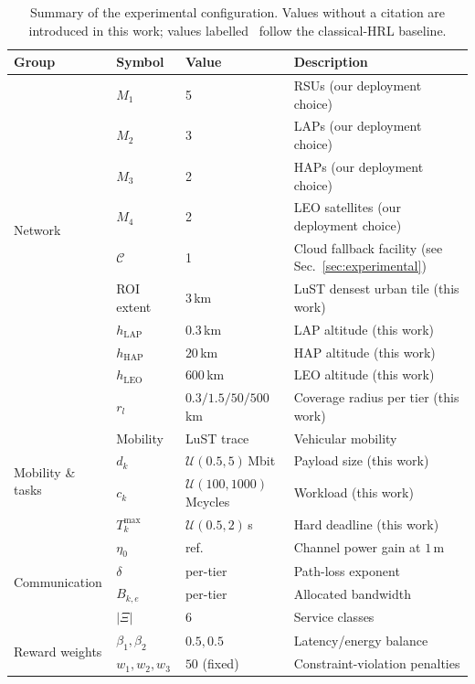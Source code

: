 \documentclass[11pt,a4paper]{article}
\theoremstyle{definition}
\begin{document}
\begin{table}[t]
\centering
\small
\caption{Summary of the experimental configuration. Values without a citation are introduced in this work; values labelled~\cite{hrl_ntn} follow the classical-HRL baseline.}
\label{tab:setup_summary}
\begin{tabular}{@{}llll@{}}
\toprule
\textbf{Group} & \textbf{Symbol} & \textbf{Value} & \textbf{Description} \\
\midrule
\multirow{9}{*}{Network}
  & $M_1$ & 5  & RSUs (our deployment choice) \\
  & $M_2$ & 3  & LAPs (our deployment choice) \\
  & $M_3$ & 2  & HAPs (our deployment choice) \\
  & $M_4$ & 2  & LEO satellites (our deployment choice) \\
  & $\mathcal{C}$ & 1 & Cloud fallback facility (see Sec.~\ref{sec:experimental}) \\
  & ROI extent & $3\,$km & LuST densest urban tile (this work) \\
  & $h_{\mathrm{LAP}}$ & $0.3\,$km & LAP altitude (this work) \\
  & $h_{\mathrm{HAP}}$ & $20\,$km & HAP altitude (this work) \\
  & $h_{\mathrm{LEO}}$ & $600\,$km & LEO altitude (this work) \\
  & $r_l$ & $0.3/1.5/50/500\,$km & Coverage radius per tier (this work) \\
\midrule
\multirow{4}{*}{Mobility \& tasks}
  & Mobility & LuST trace & Vehicular mobility~\cite{codeca2015lust} \\
  & $d_k$  & $\mathcal{U}(0.5,5)\,$Mbit & Payload size (this work) \\
  & $c_k$  & $\mathcal{U}(100,1000)\,$Mcycles & Workload (this work) \\
  & $T_k^{\max}$ & $\mathcal{U}(0.5,2)\,$s & Hard deadline (this work) \\
\midrule
\multirow{4}{*}{Communication}
  & $\eta_0$ & ref.~\cite{hrl_ntn} & Channel power gain at $1\,$m \\
  & $\delta$ & per-tier~\cite{hrl_ntn} & Path-loss exponent \\
  & $B_{k,e}$ & per-tier~\cite{hrl_ntn} & Allocated bandwidth \\
  & $|\Xi|$ & 6 & Service classes \\
\midrule
\multirow{3}{*}{Reward weights}
  & $\beta_1,\beta_2$ & $0.5,0.5$ & Latency/energy balance \\
  & $w_1,w_2,w_3$ & $50$ (fixed) & Constraint-violation penalties \\

\end{tabular}
\end{table}
\end{document}
